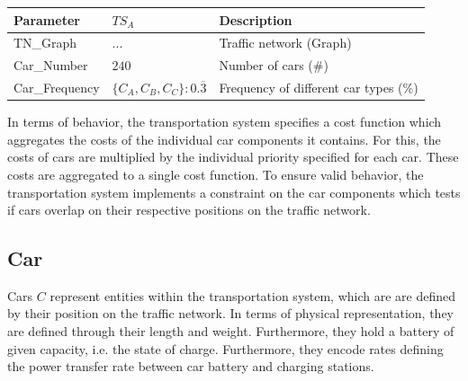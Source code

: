 \begin{table}[h]
	\renewcommand{\arraystretch}{1.3}
	\centering
	\begin{tabular}{lll}
		\hline
		\textbf{Parameter}     & \textbf{$TS_{A}$}         & \textbf{Description} \\ \hline
		TN\_Graph              & $...$    & Traffic network (Graph)    \\
		Car\_Number            & $240$    & Number of cars (\#)      \\ 
		Car\_Frequency      & $\{C_{A},C_{B},C_{C}\}:0.\overline{3}$    & Frequency of different car types (\%)       \\ \hline
	\end{tabular}
\end{table}

In terms of behavior, the transportation system specifies a cost function which aggregates the costs of the individual car components it contains. For this, the costs of cars are multiplied by the individual priority specified for each car. These costs are aggregated to a single cost function. To ensure valid behavior, the transportation system implements a constraint on the car components which tests if cars overlap on their respective positions on the traffic network.

\subsection{Car}

Cars $C$ represent entities within the transportation system, which are are defined by their position on the traffic network. In terms of physical representation, they are defined through their length and weight. Furthermore, they hold a battery of given capacity, i.e. the state of charge. Furthermore, they encode rates defining the power transfer rate between car battery and charging stations.

